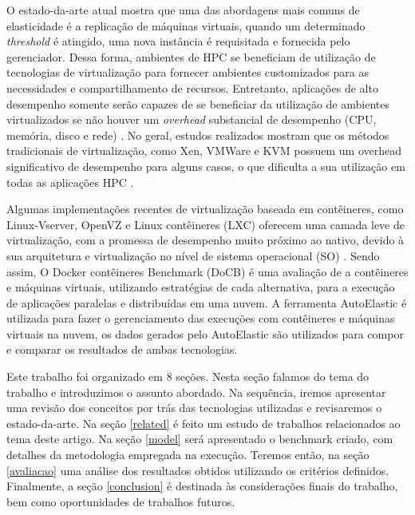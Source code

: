 \documentclass[twoside,english,brazilian]{UNISINOSartigo}
\begin{document}
O estado-da-arte atual mostra que uma das abordagens mais comuns de elasticidade é a replicação de máquinas virtuais, quando um determinado \textit{threshold} é atingido, uma nova instância é requisitada e fornecida pelo gerenciador. Dessa forma, ambientes de HPC se beneficiam de utilização de tecnologias de virtualização para fornecer ambientes customizados para as necessidades e compartilhamento de recursos. Entretanto, aplicações de alto desempenho somente serão capazes de se beneficiar da utilização de ambientes virtualizados se não houver um \textit{overhead} substancial de desempenho (CPU, memória, disco e rede) \cite{Xavier2013}. No geral, estudos realizados mostram que os métodos tradicionais de virtualização, como Xen, VMWare e KVM possuem um overhead significativo de desempenho para alguns casos, o que dificulta a sua utilização em todas as aplicações HPC \cite{Zheng2017}. 

Algumas implementações recentes de virtualização baseada em contêineres, como Linux-Vserver, OpenVZ e Linux contêineres (LXC) oferecem uma camada leve de virtualização, com a promessa de desempenho muito próximo ao nativo, devido à sua arquitetura e virtualização no nível de sistema operacional (SO) \cite{Bernstein2014}. Sendo assim, O Docker contêineres Benchmark (DoCB) é uma avaliação de a contêineres e máquinas virtuais, utilizando estratégias de cada alternativa, para a execução de aplicações paralelas e distribuídas em uma nuvem. A ferramenta AutoElastic é utilizada para fazer o gerenciamento das execuções com contêineres e máquinas virtuais na nuvem, os dados gerados pelo AutoElastic são utilizados para compor e comparar os resultados de ambas tecnologias. 

Este trabalho foi organizado em 8 seções. Nesta seção falamos do tema do trabalho e introduzimos o assunto abordado. Na sequência, iremos apresentar uma revisão dos conceitos por trás das tecnologias utilizadas e revisaremos o estado-da-arte. Na seção \ref{related} é feito um estudo de trabalhos relacionados ao tema deste artigo. Na seção \ref{model} será apresentado o benchmark criado, com detalhes da metodologia empregada na execução. Teremos então, na seção \ref{avaliacao} uma análise dos resultados obtidos utilizando os critérios definidos. Finalmente, a seção \ref{conclusion} é destinada às considerações finais do trabalho, bem como oportunidades de trabalhos futuros.
\end{document}
